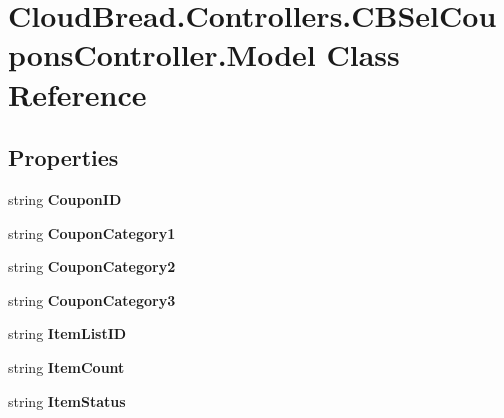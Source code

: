 \hypertarget{a00162}{}\section{Cloud\+Bread.\+Controllers.\+C\+B\+Sel\+Coupons\+Controller.\+Model Class Reference}
\label{a00162}
\subsection*{Properties}
\begin{DoxyCompactItemize}
\item 
string {\bfseries Coupon\+ID}\hypertarget{a00162_a82fb8bf3605abfebd4f4ca3cea8ce7bf}{}\label{a00162_a82fb8bf3605abfebd4f4ca3cea8ce7bf}

\item 
string {\bfseries Coupon\+Category1}\hypertarget{a00162_aae5b24c6ff0a6635e7ea421a5bd4282a}{}\label{a00162_aae5b24c6ff0a6635e7ea421a5bd4282a}

\item 
string {\bfseries Coupon\+Category2}\hypertarget{a00162_ad9c48e8fce23281c98feb6bc0d4cba92}{}\label{a00162_ad9c48e8fce23281c98feb6bc0d4cba92}

\item 
string {\bfseries Coupon\+Category3}\hypertarget{a00162_a02a023a0436b1e5fb4d3b30ab3dbb132}{}\label{a00162_a02a023a0436b1e5fb4d3b30ab3dbb132}

\item 
string {\bfseries Item\+List\+ID}\hypertarget{a00162_a549ddeee4de51649f6c85fd387f61039}{}\label{a00162_a549ddeee4de51649f6c85fd387f61039}

\item 
string {\bfseries Item\+Count}\hypertarget{a00162_a16e6a746b226c455c0afa998760cf47f}{}\label{a00162_a16e6a746b226c455c0afa998760cf47f}

\item 
string {\bfseries Item\+Status}\hypertarget{a00162_a877ebccfd2a8c55bc39f479245a8cb7f}{}\label{a00162_a877ebccfd2a8c55bc39f479245a8cb7f}


\end{DoxyCompactItemize}

